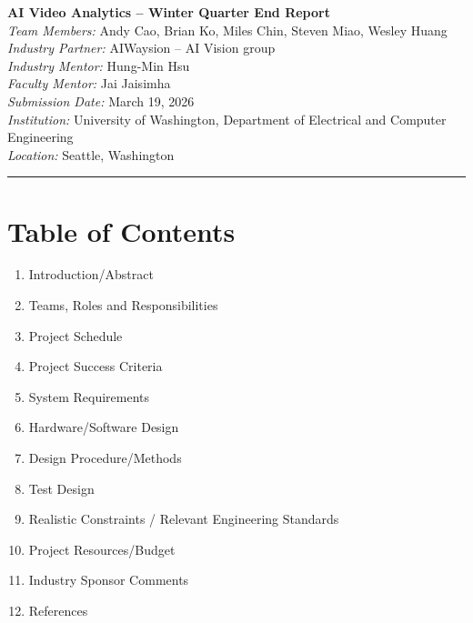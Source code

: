 \documentclass[12pt,letterpaper]{article}
\begin{document}
\begin{center}
    {\LARGE\bfseries AI Video Analytics -- Winter Quarter End Report}\\[1em]
    \textit{Team Members:} Andy Cao, Brian Ko, Miles Chin, Steven Miao, Wesley Huang\\[0.3em]
    \textit{Industry Partner:} AIWaysion -- AI Vision group\\[0.3em]
    \textit{Industry Mentor:} Hung-Min Hsu\\[0.3em]
    \textit{Faculty Mentor:} Jai Jaisimha\\[0.3em]
    \textit{Submission Date:} March 19, 2026\\[0.3em]
    \textit{Institution:} University of Washington, Department of Electrical and Computer Engineering\\[0.3em]
    \textit{Location:} Seattle, Washington
\end{center}

\vspace{1em}
\hrule
\vspace{1em}

\section*{Table of Contents}
\begin{enumerate}
    \item Introduction/Abstract
    \item Teams, Roles and Responsibilities
    \item Project Schedule
    \item Project Success Criteria
    \item System Requirements
    \item Hardware/Software Design
    \item Design Procedure/Methods
    \item Test Design
    \item Realistic Constraints / Relevant Engineering Standards
    \item Project Resources/Budget
    \item Industry Sponsor Comments
    \item References
\end{enumerate}
\end{document}
